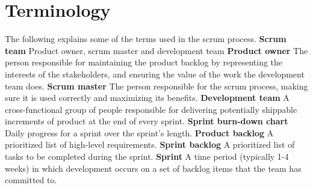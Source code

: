 \documentclass[hidelinks, 12pt, oneside]{article}
\begin{document}
 	\newpage
 	\section{Terminology}
 	The following explains some of the terms used in the scrum process.\newline\newline
 	\textbf{Scrum team}\newline
 	Product owner, scrum master and development team\newline\newline
 	\textbf{Product owner}\newline
 	The person responsible for maintaining the product backlog by representing the interests of the stakeholders, and ensuring the value of the work the development team does.\newline\newline
 	\textbf{Scrum master}\newline
 	The person responsible for the scrum process, making sure it is used correctly and maximizing its benefits.\newline\newline
 	\textbf{Development team}\newline
 	A cross-functional group of people responsible for delivering potentially shippable increments of product at the end of every sprint.\newline\newline
 	\textbf{Sprint burn-down chart}\newline
 	Daily progress for a sprint over the sprint's length.\newline\newline
 	\textbf{Product backlog}\newline
 	A prioritized list of high-level requirements.\newline\newline
 	\textbf{Sprint backlog}\newline
 	A prioritized list of tasks to be completed during the sprint.\newline\newline
 	\textbf{Sprint}\newline
 	A time period (typically 1-4 weeks) in which development occurs on a set of backlog items that the team has committed to.
 	
\end{document}
